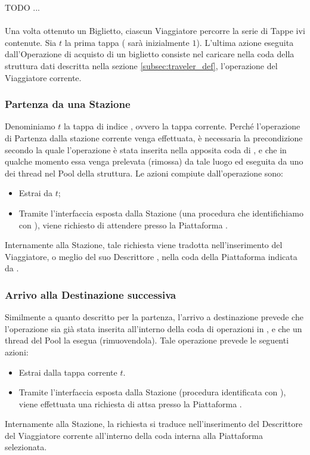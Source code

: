 	TODO
	...
	\\
	\\
	
	Una volta ottenuto un Biglietto, ciascun Viaggiatore percorre la serie di Tappe ivi contenute. Sia $t$ la prima tappa ( sarà inizialmente $1$). L'ultima azione eseguita dall'Operazione di acquisto di un biglietto consiste nel caricare nella coda della struttura dati  descritta nella sezione \ref{subsec:traveler_def}, l'operazione  del Viaggiatore corrente.
	
	\subsubsection{Partenza da una Stazione}
	
	Denominiamo $t$ la tappa di indice , ovvero la tappa corrente. Perché l'operazione di Partenza dalla stazione corrente venga effettuata, è necessaria la precondizione secondo la quale l'operazione  è stata inserita nella apposita coda di , e che in qualche momento essa venga prelevata (rimossa) da tale luogo ed eseguita da uno dei thread nel Pool della struttura. Le azioni compiute dall'operazione  sono:
	\begin{itemize}
		\item Estrai  da $t$;
		\item Tramite l'interfaccia esposta dalla Stazione  (una procedura che identifichiamo con ), viene richiesto di attendere presso la Piattaforma .
	\end{itemize} 
	
	Internamente alla Stazione, tale richiesta viene tradotta nell'inserimento del Viaggiatore, o meglio del suo Descrittore , nella coda  della Piattaforma indicata da .
	
	\subsubsection{Arrivo alla Destinazione successiva}
		
	Similmente a quanto descritto per la partenza, l'arrivo a destinazione prevede che l'operazione  sia già stata inserita all'interno della coda di operazioni in , e che un thread del Pool la esegua (rimuovendola). Tale operazione prevede le seguenti azioni:
		\begin{itemize}
			\item Estrai  dalla tappa corrente $t$.
			\item Tramite l'interfaccia esposta dalla Stazione  (procedura identificata con ), viene effettuata una richiesta di attsa presso la Piattaforma .
		\end{itemize} 
		
	Internamente alla Stazione, la richiesta si traduce nell'inserimento del Descrittore del Viaggiatore corrente all'interno della coda  interna alla Piattaforma  selezionata.
	


\newpage
	
